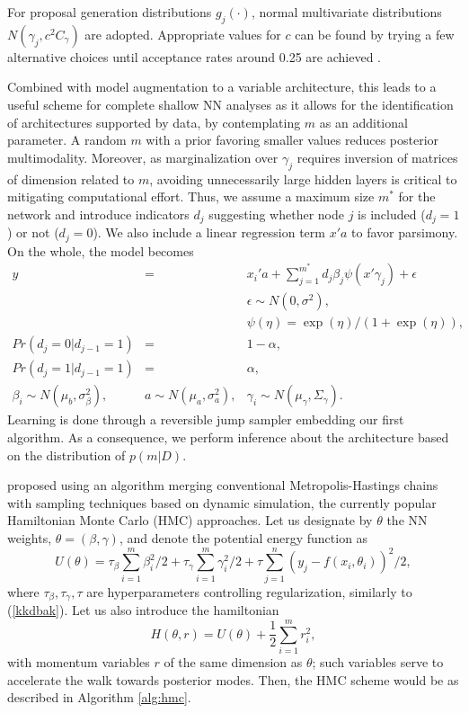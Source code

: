 \noindent For proposal generation distributions $g_j(\cdot)$,
normal multivariate distributions
$N(\gamma_j,c^2 C_\gamma)$ are 
adopted. %
Appropriate values for $c$ can be found by trying
a few alternative choices until acceptance rates around
 0.25 are achieved \parencite{gamerman}. 

Combined with model augmentation to a variable architecture,
 this leads to a useful scheme
for complete shallow NN analyses as it allows for 
the identification of
architectures supported by data, by  
contemplating $m$ as an additional parameter.
A random $m$ with a prior 
favoring smaller values reduces posterior multimodality.
Moreover, as marginalization over $\gamma_ j$ requires inversion of matrices
of dimension related to $m$, 
avoiding unnecessarily large
hidden layers is critical to
mitigating computational effort.
 Thus, we assume 
a maximum size $m^*$ for the network and introduce 
indicators  $d_j$ suggesting whether node
$j$ is included ($d_j=1$) or not ($d_j=0$). 
We  also 
include a linear regression term $x'a$
to favor parsimony. On the whole, the model
becomes 
\begin{eqnarray*}
  y          & = & x_i'a + \sum_{j=1}^{m^*} d_j\beta_j \psi(x '\gamma_j) +
                    \epsilon \\ %
                    & & \epsilon \sim N(0,\sigma^2),\nonumber \\
                    & &    \psi(\eta) = \exp(\eta)/(1+\exp(\eta)),
                        \nonumber \\
  Pr(d_j=0|d_{j-1}=1)   & = & 1-\alpha, \nonumber\\
  Pr(d_j=1|d_{j-1}=1)   & = & \alpha, \nonumber\\
  \beta_i    \sim  N(\mu_b,\sigma_\beta^2),& 
  a     \sim  N(\mu_a,\sigma_a^2), &   \gamma_i   \sim  N(\mu_\gamma,\Sigma_\gamma).
                \label{eq:model-var}
\end{eqnarray*}
Learning is done through a reversible jump sampler
\parencite{green} embedding our first algorithm.
As a consequence, we perform inference
about the architecture based on the distribution of 
 $p(m|D)$. 

 \cite{neal2012bayesian} proposed using an 
algorithm merging conventional Metropolis-Hastings chains with sampling
techniques based on dynamic simulation, the currently popular
Hamiltonian Monte Carlo (HMC) approaches.
Let us designate by $\theta$ the NN 
weights, $\theta = (\beta, \gamma)$, and denote the potential energy function as
$$
U(\theta) = \tau_{\beta}\sum_{i=1}^m \beta_i^2/2 + \tau_{\gamma} \sum_{i=1}^m \gamma_i^2/2 + \tau \sum_{j=1}^n (y_j - f(x_i, \theta_i))^2/2,
$$
where $\tau_{\beta}, \tau_{\gamma}, \tau$ are hyperparameters 
controlling regularization, similarly to (\ref{kkdbak}). 
Let us also introduce the hamiltonian 
$$
H(\theta, r) = U(\theta) + \frac{1}{2} \sum_{i=1}^m r_i^2,
$$
with momentum variables $r$ of the same dimension as $\theta$; such 
 variables serve to accelerate the walk towards posterior modes. Then, the HMC scheme would be as described in Algorithm \ref{alg:hmc}.

